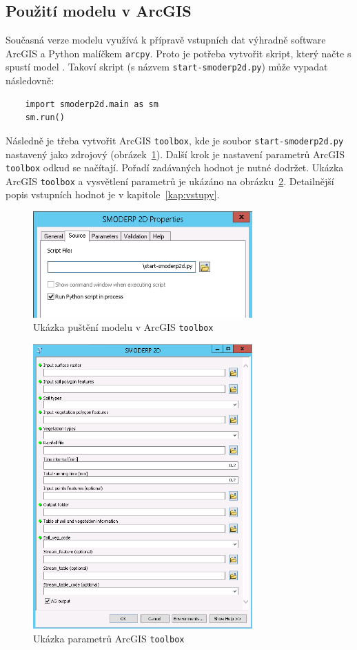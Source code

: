 \subsection{Použití modelu v ArcGIS}
  
  Současná verze modelu \smod využívá k přípravě vstupních dat výhradně software ArcGIS a Python malíčkem {\tt arcpy}. Proto je potřeba vytvořit skript, který načte s spustí model \smod. Takoví skript (s názvem {\tt start-smoderp2d.py}) může vypadat následovně:
  \begin{lstlisting}
    import smoderp2d.main as sm
    sm.run()
  \end{lstlisting}
  
  Následně je třeba vytvořit ArcGIS {\tt toolbox}, kde je soubor {\tt start-smoderp2d.py} nastavený jako zdrojový (obrázek~\ref{fig:tbsource}). Další krok je nastavení parametrů ArcGIS {\tt toolbox} odkud se načítají. Pořadí zadávaných hodnot je nutné dodržet. Ukázka ArcGIS {\tt toolbox} a vysvětlení parametrů je ukázáno na obrázku~\ref{fig:toolbox}. Detailnější popis vstupních hodnot je v kapitole~\ref{kap:vstupy}.
  
  \begin{figure}
    \centering
    \includegraphics[width=0.75\textwidth]{./img/start-smoderp.png}
    \caption{Ukázka puštění modelu \smod v ArcGIS {\tt toolbox}}
    \label{fig:tbsource}
  \end{figure}  
  
  
  \begin{figure}
    \centering
    \includegraphics[width=0.75\textwidth]{./img/toolbox.png}
    \caption{Ukázka parametrů ArcGIS {\tt toolbox}}
    \label{fig:toolbox}
  \end{figure}  
  
  
  
  
  